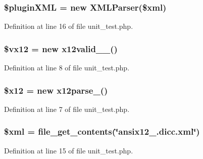\hypertarget{unit__test_8php_af15694db34a7234a2b68004854ad84ca}{
\subsubsection[{\$plugin\-X\-M\-L}]{\setlength{\rightskip}{0pt plus 5cm}\$plugin\-X\-M\-L = new {\bf \-X\-M\-L\-Parser}(\$xml)}}\label{unit__test_8php_af15694db34a7234a2b68004854ad84ca}


\-Definition at line 16 of file unit\-\_\-test.\-php.

\hypertarget{unit__test_8php_a58edce330f12eb9ca3236c741d52b111}{
\subsubsection[{\$vx12}]{\setlength{\rightskip}{0pt plus 5cm}\$vx12 = new {\bf x12valid\-\_\-\_}()}}\label{unit__test_8php_a58edce330f12eb9ca3236c741d52b111}


\-Definition at line 8 of file unit\-\_\-test.\-php.

\hypertarget{unit__test_8php_a45642999bffdb0dfbf3e7d12a9d2e431}{
\subsubsection[{\$x12}]{\setlength{\rightskip}{0pt plus 5cm}\$x12 = new {\bf x12parse\-\_}()}}\label{unit__test_8php_a45642999bffdb0dfbf3e7d12a9d2e431}


\-Definition at line 7 of file unit\-\_\-test.\-php.

\hypertarget{unit__test_8php_aa108d9d91e700ac530401dd363b0723b}{
\subsubsection[{\$xml}]{\setlength{\rightskip}{0pt plus 5cm}\$xml = file\-\_\-get\-\_\-contents(\char`\"{}ansix12\-\_.\-dicc.\-xml\char`\"{})}}\label{unit__test_8php_aa108d9d91e700ac530401dd363b0723b}


\-Definition at line 15 of file unit\-\_\-test.\-php.

